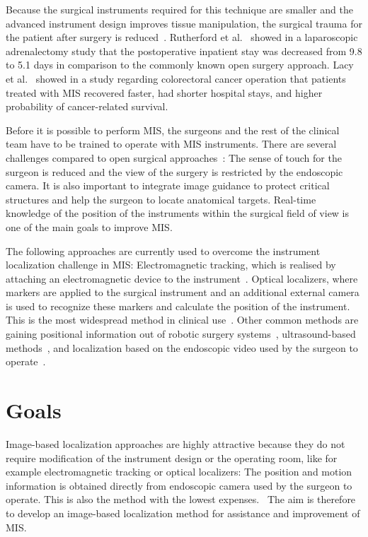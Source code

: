 Because the surgical instruments required for this technique are smaller and the advanced instrument 
design improves tissue manipulation, the surgical trauma for the patient after surgery is reduced~\cite{vision_based_surg_tool_det2017bouget}. 
Rutherford et al.~\cite{laparoscopic_adrenalectomy1996rutherford} showed in a laparoscopic adrenalectomy study that the postoperative inpatient stay was decreased from 9.8 to 5.1 days in comparison to the commonly known open surgery approach. Lacy et al.~\cite{laparoscp2002lacy} showed in a study regarding colorectoral cancer operation that patients treated with MIS recovered faster, had shorter hospital stays, and higher probability of cancer-related survival.


Before it is possible to perform MIS, the surgeons and the rest of the clinical team have to be trained to operate with MIS instruments. There are several challenges compared to open surgical approaches~\cite{haptic_feedback_surgery2009vanderMeijden}: 
The sense of touch for the surgeon is reduced and the view of the surgery is restricted by the endoscopic camera. It is also important to integrate image guidance to protect critical structures and help the surgeon to locate anatomical targets. Real-time knowledge of the position of the instruments within the surgical field of view is one of the main goals to improve MIS.~\cite{detect_instruments_mis2013allan} 

The following approaches are currently used to overcome the instrument localization challenge in MIS:
Electromagnetic tracking, which is realised by attaching an electromagnetic device to the instrument~\cite{electromagnetic_tracking2016lahanas}.
Optical localizers, where markers are applied to the surgical instrument and an additional external camera is used to recognize these markers and calculate the position of the instrument. This is the most widespread method in clinical use~\cite{optical_localizer_instr2010elfring}.
Other common methods are gaining positional information out of robotic surgery systems~\cite{da_vinci_localization2005Leven}, 
ultrasound-based methods~\cite{ultrasound_localization2009Hu}, and localization based on the endoscopic video used by the surgeon to operate~\cite{Laina2017}.

\section{Goals}
Image-based localization approaches are highly attractive because they do not require modification of the instrument design or the operating room, like for example electromagnetic tracking or optical localizers: 
The position and motion information is obtained directly from endoscopic camera used by the surgeon to operate. This is also the method with the lowest expenses.~\cite{vision_based_surg_tool_det2017bouget}
The aim is therefore to develop an image-based localization method for assistance and improvement of MIS.


